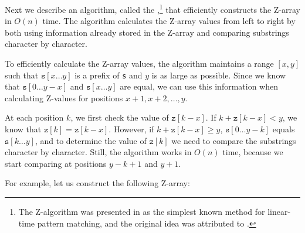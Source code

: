 Next we describe an algorithm,
called the ,\footnote{The Z-algorithm
    was presented in \cite{gus97} as the simplest known
    method for linear-time pattern matching, and the original idea
    was attributed to \cite{mai84}.}
that efficiently constructs the Z-array in $O(n)$ time.
The algorithm calculates the Z-array values
from left to right by both using information
already stored in the Z-array and comparing substrings
character by character.

To efficiently calculate the Z-array values,
the algorithm maintains a range $[x,y]$ such that
$\texttt{s}[x \ldots y]$ is a prefix of \texttt{s}
and $y$ is as large as possible.
Since we know that $\texttt{s}[0 \ldots y-x]$
and $\texttt{s}[x \ldots y]$ are equal,
we can use this information when calculating
Z-values for positions $x+1,x+2,\ldots,y$.

At each position $k$, we first
check the value of $\texttt{z}[k-x]$.
If $k+\texttt{z}[k-x]<y$, we know that $\texttt{z}[k]=\texttt{z}[k-x]$.
However, if $k+\texttt{z}[k-x] \ge y$,
$\texttt{s}[0 \ldots y-k]$ equals
$\texttt{s}[k \ldots y]$, and to determine the
value of $\texttt{z}[k]$ we need to compare
the substrings character by character.
Still, the algorithm works in $O(n)$ time,
because we start comparing at positions
$y-k+1$ and $y+1$.

For example, let us construct the following Z-array:

